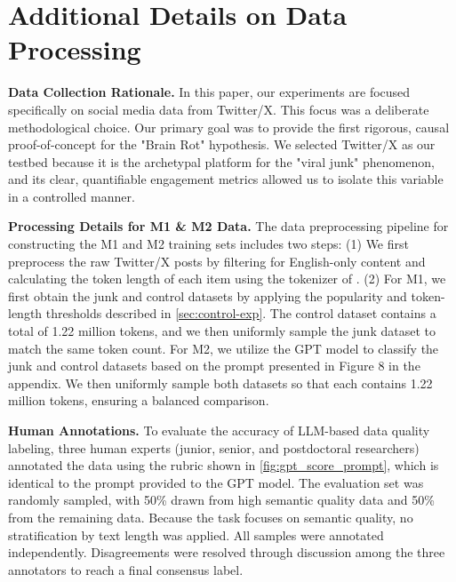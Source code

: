
\section{Additional Details on Data Processing}

\textbf{Data Collection Rationale.}
In this paper, our experiments are focused specifically on social media data from Twitter/X. This focus was a deliberate methodological choice. Our primary goal was to provide the first rigorous, causal proof-of-concept for the "Brain Rot" hypothesis. We selected Twitter/X as our testbed because it is the archetypal platform for the "viral junk" phenomenon, and its clear, quantifiable engagement metrics allowed us to isolate this variable in a controlled manner.

\textbf{Processing Details for M1 \& M2 Data.}
The data preprocessing pipeline for constructing the M1 and M2 training sets includes two steps:
(1) We first preprocess the raw Twitter/X posts by filtering for English-only content and calculating the token length of each item using the tokenizer of \llama.
(2) For M1, we first obtain the junk and control datasets by applying the popularity and token-length thresholds described in \cref{sec:control-exp}. The control dataset contains a total of 1.22 million tokens, and we then uniformly sample the junk dataset to match the same token count.
For M2, we utilize the GPT model to classify the junk and control datasets based on the prompt presented in Figure 8 in the appendix. We then uniformly sample both datasets so that each contains 1.22 million tokens, ensuring a balanced comparison.



\textbf{Human Annotations.} To evaluate the accuracy of LLM-based data quality labeling, three human experts (junior, senior, and postdoctoral researchers) annotated the data using the rubric shown in \cref{fig:gpt_score_prompt}, which is identical to the prompt provided to the GPT model. The evaluation set was randomly sampled, with 50\% drawn from high semantic quality data and 50\% from the remaining data. Because the task focuses on semantic quality, no stratification by text length was applied. All samples were annotated independently. Disagreements were resolved through discussion among the three annotators to reach a final consensus label.









